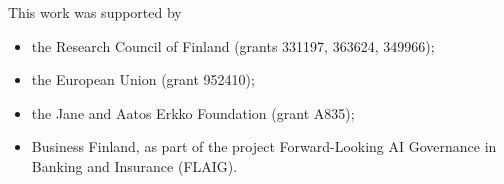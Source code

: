 \documentclass[journal,12pt,onecolumn]{article}
\newif\iffastdraft
\begin{document}
\noindent This work was supported by
\begin{itemize} 
	\item the Research Council of Finland (grants 331197, 363624, 349966);
	\item the European Union (grant 952410);
	\item the Jane and Aatos Erkko Foundation (grant A835); 
	\item Business Finland, as part of the project Forward-Looking AI Governance in Banking and Insurance (FLAIG).
\end{itemize} 



\newpage

\tableofcontents



\newpage



\glsaddallunused


\printglossary[type=math,title={Tools}, nonumberlist]

\newpage
\printglossary[title={Machine Learning Concepts}, nonumberlist]

\printglossary[type=systems, title={Machine Learning Systems}, nonumberlist]

\newpage
\printglossary[type=regulation,title={Machine Learning Regulation}, nonumberlist]


\iffastdraft

\else

\newpage


\printindex
\fi


\newpage


\end{document}

